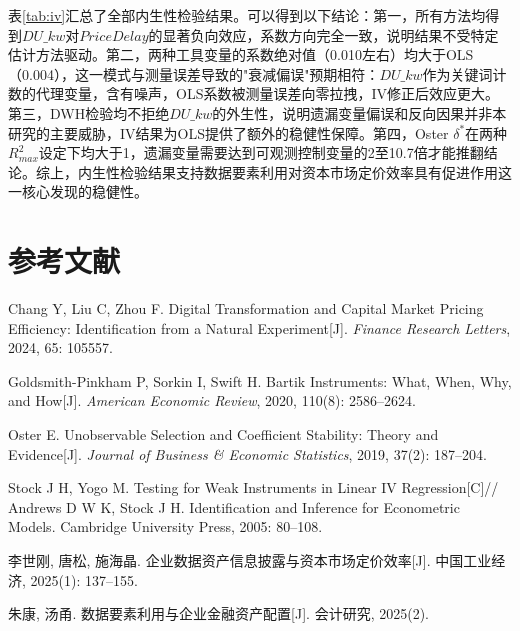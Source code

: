 \documentclass[11pt,a4paper]{article}
\begin{document}
表\ref{tab:iv}汇总了全部内生性检验结果。可以得到以下结论：第一，所有方法均得到$DU\_kw$对$PriceDelay$的显著负向效应，系数方向完全一致，说明结果不受特定估计方法驱动。第二，两种工具变量的系数绝对值（0.010左右）均大于OLS（0.004），这一模式与测量误差导致的"衰减偏误"预期相符：$DU\_kw$作为关键词计数的代理变量，含有噪声，OLS系数被测量误差向零拉拽，IV修正后效应更大。第三，DWH检验均不拒绝$DU\_kw$的外生性，说明遗漏变量偏误和反向因果并非本研究的主要威胁，IV结果为OLS提供了额外的稳健性保障。第四，Oster $\delta^*$在两种$R^2_{max}$设定下均大于1，遗漏变量需要达到可观测控制变量的2至10.7倍才能推翻结论。综上，内生性检验结果支持数据要素利用对资本市场定价效率具有促进作用这一核心发现的稳健性。

\section*{参考文献}

\begin{enumerate}[label={[\arabic*]}, leftmargin=2em, itemsep=3pt]

\item Chang Y, Liu C, Zhou F. Digital Transformation and Capital Market Pricing Efficiency: Identification from a Natural Experiment[J]. \textit{Finance Research Letters}, 2024, 65: 105557.

\item Goldsmith-Pinkham P, Sorkin I, Swift H. Bartik Instruments: What, When, Why, and How[J]. \textit{American Economic Review}, 2020, 110(8): 2586--2624.

\item Oster E. Unobservable Selection and Coefficient Stability: Theory and Evidence[J]. \textit{Journal of Business \& Economic Statistics}, 2019, 37(2): 187--204.

\item Stock J H, Yogo M. Testing for Weak Instruments in Linear IV Regression[C]// Andrews D W K, Stock J H. Identification and Inference for Econometric Models. Cambridge University Press, 2005: 80--108.

\item 李世刚, 唐松, 施海晶. 企业数据资产信息披露与资本市场定价效率[J]. 中国工业经济, 2025(1): 137--155.

\item 朱康, 汤甬. 数据要素利用与企业金融资产配置[J]. 会计研究, 2025(2).

\end{enumerate}
\end{document}
